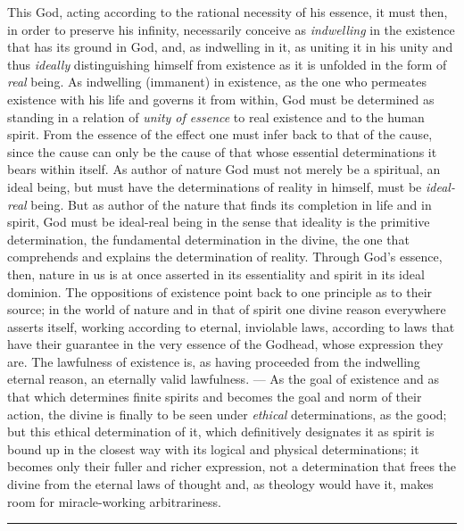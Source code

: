 \documentclass[12pt,a4paper,openany]{book}
\newcommand{\opage}[1]{\marginnote{\footnotesize\textit{[#1]}}}
\begin{document}
This God, acting according to the rational necessity of his essence,
it must then, in order to preserve his infinity, necessarily conceive
as \emph{indwelling} in the existence that has its ground in God, and,
as indwelling in it, as uniting it in his unity and thus \emph{ideally}
distinguishing himself from existence as it is unfolded in the form
of \emph{real} being. As indwelling (immanent) in existence, as the one
who permeates existence with his life and governs it from within, God
must be determined as standing in a relation of \emph{unity of essence}
to real existence and to the human spirit. From the essence of the
effect one must infer back to that of the cause, since the cause can
only be the cause of that whose essential determinations it bears
within itself. As author of nature God must not merely be a
spiritual, an ideal being, but must have the determinations of
reality in himself, must be \emph{ideal-real} being. But as author of
the nature that finds its completion in life and in spirit, God must
be ideal-real being in the sense that ideality is the primitive
determination, the fundamental determination
\opage{502}in the divine, the one that comprehends and explains the determination of reality.
Through God's essence, then, nature in us is at once
asserted in its essentiality and spirit in its ideal dominion.
The oppositions of existence point back to one principle as to
their source; in the world of nature and in that of spirit one
divine reason everywhere asserts itself, working according to eternal,
inviolable laws, according to laws that have their guarantee
in the very essence of the Godhead, whose expression they are. The
lawfulness of existence is, as having proceeded from the indwelling eternal
reason, an eternally valid lawfulness. --- As the goal of existence
and as that which determines finite spirits and becomes the goal
and norm of their action, the divine is finally
to be seen under \emph{ethical} determinations, as the good; but this
ethical determination of it, which definitively designates it as
spirit is bound up in the closest way with its logical and
physical determinations; it becomes only their fuller and
richer expression, not a determination that frees the divine
from the eternal laws of thought and, as theology would have it,
makes room for miracle-working arbitrariness.

\begin{center}\rule{1.8cm}{0.4pt}\end{center}
\end{document}
